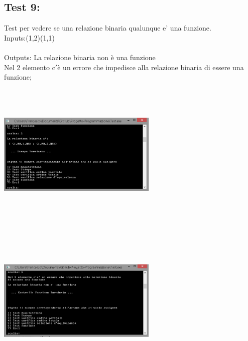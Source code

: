 \documentclass[11pt, a4paper, titlepage, block]{article}
\begin{document}
	\subsection{Test 9:}
	Test per vedere se una relazione binaria qualunque e' una funzione.\\
	Inputs:(1,2)(1,1)\\
	\\
	Outputs: La relazione binaria non \`e una funzione\\
	Nel 2 elemento c$'$\`e un errore che impedisce alla relazione binaria di essere una funzione;\\
	\includegraphics[width=3in,height=3in,viewport=0 0 300 300]{../Screenshots/Test9Input.png}
	\\
	\includegraphics[width=3in,height=3in,viewport=0 0 300 300]{../Screenshots/Test9Output.PNG}
	\\
	\\
	\newpage
\end{document}
